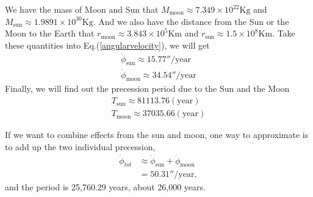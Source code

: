 \documentclass[%
 reprint,
 amsmath,amssymb,
 aps,
]{revtex4-1}
\begin{document}
We have the mass of Moon and Sun that $M_{\mathrm{moon}}\approx7.349\times10^{22}\mathrm{Kg}$ and $M_{\mathrm{sun}}\approx1.9891\times10^{30}\mathrm{Kg}$. And we also have the distance from the Sun or the Moon to the Earth that $r_{\mathrm{moon}}\approx3.843\times10^5\mathrm{Km}$ and $r_{\mathrm{sun}}\approx1.5\times10^8\mathrm{Km}$. Take these quantities into Eq.(\ref{angularvelocity}), we will get \begin{equation}
\begin{aligned}
  \dot{\phi}_{\mathrm{sun}}\approx15.77''/\mathrm{year}  
  \\\dot{\phi}_{\mathrm{moon}}\approx34.54''/\mathrm{year}
\end{aligned}
\end{equation}
Finally, we will find out the precession period due to the Sun and the Moon
\begin{equation}
\begin{aligned}
T_{\mathrm{sun}}\approx81113.76(\mathrm{year})\\
T_{\mathrm{moon}}\approx37035.66(\mathrm{year})
\end{aligned}
\end{equation}

If we want to combine effects from the sun and moon, one way to approximate is to add up the two individual precession,
\begin{equation}
\begin{aligned}
    \dot{\phi}_{tot}&\approx\dot{\phi}_{\mathrm{sun}}+\dot{\phi}_{\mathrm{moon}} \\
    &=50.31''/\mathrm{year},
\end{aligned}
\end{equation}
and the period is 25,760.29 years, about 26,000 years.
\end{document}
